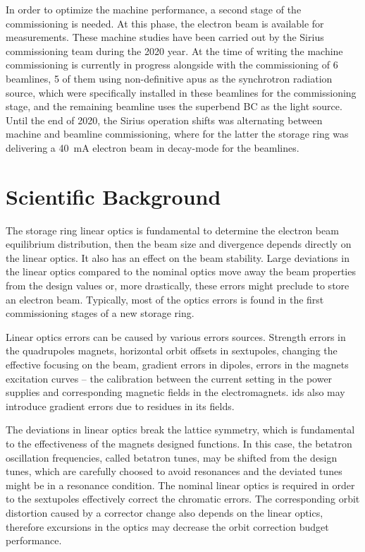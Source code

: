 In order to optimize the machine performance, a second stage of the commissioning is needed. At this phase, the electron beam is available for measurements. These machine studies have been carried out by the Sirius commissioning team during the 2020 year. At the time of writing the machine commissioning is currently in progress alongside with the commissioning of 6 beamlines, 5 of them using non-definitive \glspl{apu} as the synchrotron radiation source, which were specifically installed in these beamlines for the commissioning stage, and the remaining beamline uses the superbend BC as the light source. Until the end of 2020, the Sirius operation shifts was alternating between machine and beamline commissioning, where for the latter the storage ring was delivering a \SI{40}{\milli\ampere} electron beam in decay-mode for the beamlines.
\section{Scientific Background}\label{sec:background}
The storage ring linear optics is fundamental to determine the electron beam equilibrium distribution, then the beam size and divergence depends directly on the linear optics. It also has an effect on the beam stability. Large deviations in the linear optics compared to the nominal optics move away the beam properties from the design values or, more drastically, these errors might preclude to store an electron beam. Typically, most of the optics errors is found in the first commissioning stages of a new storage ring.

Linear optics errors can be caused by various errors sources. Strength errors in the quadrupoles magnets, horizontal orbit offsets in sextupoles, changing the effective focusing on the beam, gradient errors in dipoles, errors in the magnets excitation curves -- the calibration between the current setting in the power supplies and corresponding magnetic fields in the electromagnets. \glspl{id} also may introduce gradient errors due to residues in its fields.

The deviations in linear optics break the lattice symmetry, which is fundamental to the effectiveness of the magnets designed functions. In this case, the betatron oscillation frequencies, called betatron tunes, may be shifted from the design tunes, which are carefully choosed to avoid resonances and the deviated tunes might be in a resonance condition. The nominal linear optics is required in order to the sextupoles effectively correct the chromatic errors. The corresponding orbit distortion caused by a corrector change also depends on the linear optics, therefore excursions in the optics may decrease the orbit correction budget performance.

